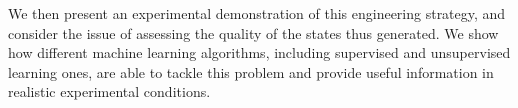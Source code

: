 We then present an experimental demonstration of this engineering strategy, and consider the issue of assessing the quality of the states thus generated.
We show how different machine learning algorithms, including supervised and unsupervised learning ones, are able to tackle this problem and provide useful information in realistic experimental conditions.


\clearpage


\tableofcontents



\clearpage

